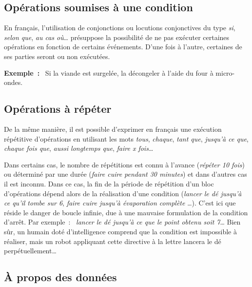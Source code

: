 		\subsection{Opérations soumises à une condition}
		
			En français, 
			l’utilisation de conjonctions ou locutions conjonctives 
			du type \textit{si}, \textit{selon que}, \textit{au cas où}\dots{}
			présuppose la possibilité 
			de ne pas exécuter certaines opérations 
			en fonction de certains événements. 
			D’une fois à l’autre, 
			certaines de ses parties seront ou non exécutées.
			
			\textbf{Exemple~:}~
			Si la viande est surgelée, 
			la décongeler à l’aide du four à micro-ondes.
	
		\subsection{Opérations à répéter}
		
			De la même manière, 
			il est possible d’exprimer en français une exécution
			répétitive d’opérations en utilisant les mots \textit{tous},
			\textit{chaque}, \textit{tant que}, \textit{jusqu’à ce que},
			\textit{chaque fois que}, \textit{aussi longtemps que}, 
			\textit{faire x fois}\dots 
			
			Dans certains cas, 
			le nombre de répétitions est connu à l’avance
			(\textit{répéter 10 fois}) 
			ou déterminé par une durée 
			(\textit{faire cuire pendant 30 minutes}) 
			et dans d’autres cas il est inconnu.
			Dans ce cas, la fin de la période de répétition 
			d’un bloc d’opérations dépend alors 
			de la réalisation d’une condition 
			(\textit{lancer le dé jusqu’à ce qu’il tombe sur 6}, 
			\textit{faire cuire jusqu’à évaporation complète} \dots). 
			C’est ici que réside le danger de boucle infinie, 
			due à une mauvaise formulation de la condition d’arrêt.
			Par exemple~:~
			\textit{lancer le dé jusqu’à ce que le point obtenu soit 7}\dots{} 
			Bien sûr, 
			un humain doté d’intelligence comprend 
			que la condition est impossible à réaliser, 
			mais un robot appliquant cette directive à la lettre 
			lancera le dé perpétuellement\dots
	
		\subsection{À propos des données}
		
